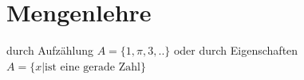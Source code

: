 \documentclass[a4paper]{article}
\begin{document}
	
\section{Mengenlehre}
	\begin{fdef}
	durch Aufzählung $A=\{1,\pi,3,..\}$ oder durch Eigenschaften $A=\{x| \text{ist eine gerade Zahl}\}$
	\end{fdef}
\end{document}
